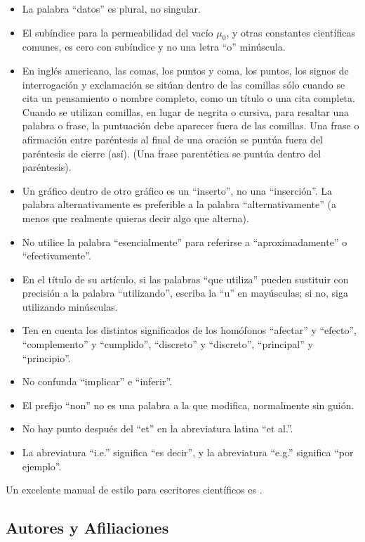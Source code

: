 \begin{itemize}
    \item La palabra ``datos'' es plural, no singular.
    \item El subíndice para la permeabilidad del vacío $\mu_{0}$, y otras constantes científicas comunes, es cero con subíndice y no una letra ``o'' minúscula.
    \item En inglés americano, las comas, los puntos y coma, los puntos, los signos de interrogación y exclamación se sitúan dentro de las comillas sólo cuando se cita un pensamiento o nombre completo, como un título o una cita completa. Cuando se utilizan comillas, en lugar de negrita o cursiva, para resaltar una palabra o frase, la puntuación debe aparecer fuera de las comillas. Una frase o afirmación entre paréntesis al final de una oración se puntúa fuera del paréntesis de cierre (así). (Una frase parentética se puntúa dentro del paréntesis).
    \item Un gráfico dentro de otro gráfico es un ``inserto'', no una ``inserción''. La palabra alternativamente es preferible a la palabra ``alternativamente'' (a menos que realmente quieras decir algo que alterna).
    \item No utilice la palabra ``esencialmente'' para referirse a ``aproximadamente'' o ``efectivamente''.
    \item En el título de su artículo, si las palabras ``que utiliza'' pueden sustituir con precisión a la palabra ``utilizando'', escriba la ``u'' en mayúsculas; si no, siga utilizando minúsculas.
    \item Ten en cuenta los distintos significados de los homófonos ``afectar'' y ``efecto'', ``complemento'' y ``cumplido'', ``discreto'' y ``discreto'', ``principal'' y ``principio''.
    \item No confunda ``implicar'' e ``inferir''.
    \item El prefijo ``non'' no es una palabra a la que modifica, normalmente sin guión.
    \item No hay punto después del ``et'' en la abreviatura latina ``et al.''.
    \item La abreviatura ``i.e.'' significa ``es decir'', y la abreviatura ``e.g.'' significa ``por ejemplo''.
\end{itemize}
Un excelente manual de estilo para escritores científicos es \cite{young1989}.

\subsection{Autores y Afiliaciones} \label{subsec:autor_afilia}

